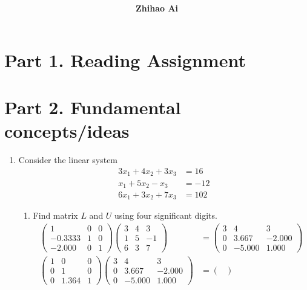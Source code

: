 \documentclass[10pt]{report}
\title{
	\vspace{2in}
	\textmd{\textbf{\hwCourse\\\hwTitle}}\\
	\vspace{0.3in}\large{\textit{\hmwkClassInstructor}}
	\vspace{3in}
}
\author{\textbf{Zhihao Ai}}
\date{}
\begin{document}
\maketitle

\section*{Part 1. Reading Assignment}

\section*{Part 2. Fundamental concepts/ideas}
\begin{enumerate}
	\item 
	Consider the linear system
	\begin{align*}
	3x_1 + 4x_2 + 3x_3 &= 16 \\
	x_1 + 5x_2 - x_3 &= -12 \\
	6x_1 + 3x_2 + 7x_3 &= 102
	\end{align*}
	\begin{enumerate}
		\item 
		Find matrix $L$ and $U$ using four significant digits.
		\begin{align*}
		\begin{pmatrix}
		1 & 0 & 0\\
		-0.3333 & 1 & 0\\
		-2.000 & 0 & 1
		\end{pmatrix}
		\begin{pmatrix}
		3 & 4 & 3\\
		1 & 5 & -1\\
		6 & 3 & 7
		\end{pmatrix}
		&=
		\begin{pmatrix}
		3 & 4 & 3\\
		0 & 3.667 & -2.000\\
		0 & -5.000 & 1.000
		\end{pmatrix}
		\tag{$L_1 A= A_1$}
		\\
		\begin{pmatrix}
		1 & 0 & 0\\
		0 & 1 & 0\\
		0 & 1.364  & 1
		\end{pmatrix}
		\begin{pmatrix}
		3 & 4 & 3\\
		0 & 3.667 & -2.000\\
		0 & -5.000 & 1.000
		\end{pmatrix}
		&=
		\begin{pmatrix}

\end{pmatrix}
\end{align*}
\end{enumerate}
\end{enumerate}
\end{document}

